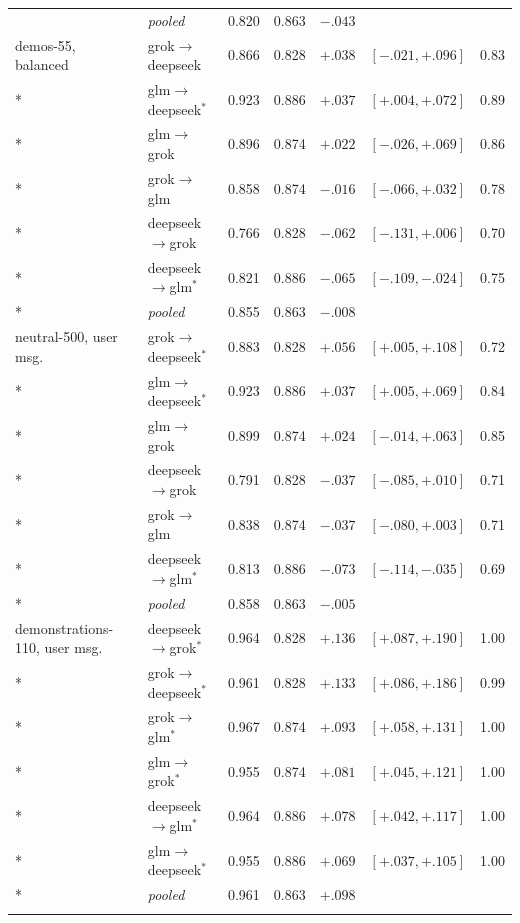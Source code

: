 {\begin{longtable}{llrlrrr}
 & \emph{pooled} & 0.820 & 0.863 & $-.043$ & & \\
\addlinespace
demos-55, balanced & grok$\to$deepseek & 0.866 & 0.828 & $+.038$ & $[-.021,+.096]$ & 0.83 \\*
 & glm$\to$deepseek$^{*}$ & 0.923 & 0.886 & $+.037$ & $[+.004,+.072]$ & 0.89 \\*
 & glm$\to$grok & 0.896 & 0.874 & $+.022$ & $[-.026,+.069]$ & 0.86 \\*
 & grok$\to$glm & 0.858 & 0.874 & $-.016$ & $[-.066,+.032]$ & 0.78 \\*
 & deepseek$\to$grok & 0.766 & 0.828 & $-.062$ & $[-.131,+.006]$ & 0.70 \\*
 & deepseek$\to$glm$^{*}$ & 0.821 & 0.886 & $-.065$ & $[-.109,-.024]$ & 0.75 \\*
 & \emph{pooled} & 0.855 & 0.863 & $-.008$ & & \\
\addlinespace
neutral-500, user msg. & grok$\to$deepseek$^{*}$ & 0.883 & 0.828 & $+.056$ & $[+.005,+.108]$ & 0.72 \\*
 & glm$\to$deepseek$^{*}$ & 0.923 & 0.886 & $+.037$ & $[+.005,+.069]$ & 0.84 \\*
 & glm$\to$grok & 0.899 & 0.874 & $+.024$ & $[-.014,+.063]$ & 0.85 \\*
 & deepseek$\to$grok & 0.791 & 0.828 & $-.037$ & $[-.085,+.010]$ & 0.71 \\*
 & grok$\to$glm & 0.838 & 0.874 & $-.037$ & $[-.080,+.003]$ & 0.71 \\*
 & deepseek$\to$glm$^{*}$ & 0.813 & 0.886 & $-.073$ & $[-.114,-.035]$ & 0.69 \\*
 & \emph{pooled} & 0.858 & 0.863 & $-.005$ & & \\
\addlinespace
demonstrations-110, user msg. & deepseek$\to$grok$^{*}$ & 0.964 & 0.828 & $+.136$ & $[+.087,+.190]$ & 1.00 \\*
 & grok$\to$deepseek$^{*}$ & 0.961 & 0.828 & $+.133$ & $[+.086,+.186]$ & 0.99 \\*
 & grok$\to$glm$^{*}$ & 0.967 & 0.874 & $+.093$ & $[+.058,+.131]$ & 1.00 \\*
 & glm$\to$grok$^{*}$ & 0.955 & 0.874 & $+.081$ & $[+.045,+.121]$ & 1.00 \\*
 & deepseek$\to$glm$^{*}$ & 0.964 & 0.886 & $+.078$ & $[+.042,+.117]$ & 1.00 \\*
 & glm$\to$deepseek$^{*}$ & 0.955 & 0.886 & $+.069$ & $[+.037,+.105]$ & 1.00 \\*
 & \emph{pooled} & 0.961 & 0.863 & $+.098$ & & \\
\addlinespace

\end{longtable}}
